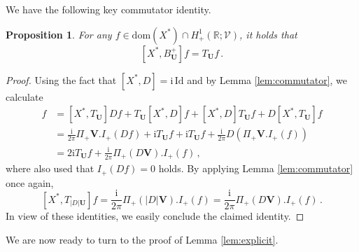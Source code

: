 \documentclass[11pt,reqno]{amsart}
\newtheorem{prop}{Proposition}[section]
\theoremstyle{definition}
\theoremstyle{remark}
\theoremstyle{remark}
\numberwithin{equation}{section}
\newcommand{\R}{\mathbb{R}}
\newcommand{\VV}{\mathcal{V}}
\newcommand{\dom}{\mathrm{dom}}
\newcommand{\ii}{\mathrm{i}}
\newcommand{\Vb}{\mathbf{V}}
\newcommand{\Ub}{\mathbf{U}}
\newcommand{\id}{\mathrm{Id}}
\begin{document}
We have the following key commutator identity.
\begin{prop} \label{prop:G_B}
For any $f \in \dom(X^*) \cap H^1_+(\R; \VV)$, it holds that
$$
[X^*, B^+_{\Ub}] f = T_{\Ub} f \, .
$$ 
\end{prop}

\begin{proof}
Using the fact that $[X^*, D] = \ii \, \id$ and by Lemma \ref{lem:commutator}, we calculate
\begin{align*}
[X^*, T_{\Ub} D + D T_{\Ub}] f & = [X^*, T_{\Ub}] Df + T_{\Ub} [X^*,D] f + [X^*,D] T_{\Ub} f + D [X^*,T_{\Ub}] f \\
& = \frac{\ii}{2 \pi} \Pi_+ \Vb.I_+(Df) + \ii T_{\Ub} f + \ii T_{\Ub} f + \frac{\ii}{2 \pi} D (\Pi_+ \Vb.I_+(f)) \\
& = 2 \ii T_{\Ub} f + \frac{\ii}{2 \pi} \Pi_+(D \Vb).I_+(f) \, ,
\end{align*}
where also used that $I_+(Df)=0$ holds. By applying Lemma \ref{lem:commutator} once again, 
$$
[X^*,T_{|D| \Ub}] f = \frac{\ii}{2 \pi} \Pi_+(|D| \Vb).I_+(f) = \frac{\ii}{2 \pi} \Pi_+(D \Vb).I_+(f) \, .
$$
In view of these identities, we easily conclude the claimed identity.
\end{proof}

We are now ready to turn to the proof of Lemma \ref{lem:explicit}.
\end{document}
